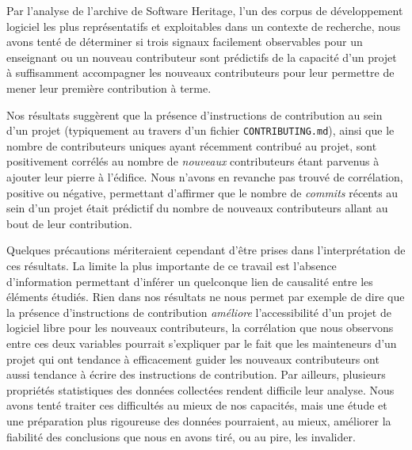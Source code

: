 \documentclass[dvipsnames,runningheads]{llncs}
\newcommand{\en}[1]{\foreignlanguage{english}{\emph{#1}}}
\begin{document}
    Par l'analyse de l'archive de Software Heritage, l'un des corpus de développement logiciel les plus
    représentatifs et exploitables dans un contexte de recherche, nous avons tenté de déterminer si trois
    signaux facilement observables pour un enseignant ou un nouveau contributeur sont prédictifs de la
    capacité d'un projet à suffisamment accompagner les nouveaux contributeurs pour leur permettre de mener
    leur première contribution à terme.

    Nos résultats suggèrent que la présence d'instructions de contribution au sein d'un projet (typiquement au
    travers d'un fichier \texttt{CONTRIBUTING.md}), ainsi que le nombre de contributeurs uniques ayant
    récemment contribué au projet, sont positivement corrélés au nombre de \emph{nouveaux} contributeurs étant
    parvenus à ajouter leur pierre à l'édifice. Nous n'avons en revanche pas trouvé de corrélation, positive
    ou négative, permettant d'affirmer que le nombre de \en{commits} récents au sein d'un projet était
    prédictif du nombre de nouveaux contributeurs allant au bout de leur contribution.

    Quelques précautions mériteraient cependant d'être prises dans l'interprétation de ces résultats. La
    limite la plus importante de ce travail est l'absence d'information permettant d'inférer un quelconque
    lien de causalité entre les éléments étudiés. Rien dans nos résultats ne nous permet par exemple de dire
    que la présence d'instructions de contribution \emph{améliore} l'accessibilité d'un projet de logiciel
    libre pour les nouveaux contributeurs, la corrélation que nous observons entre ces deux variables pourrait
    s'expliquer par le fait que les mainteneurs d'un projet qui ont tendance à efficacement guider les
    nouveaux contributeurs ont aussi tendance à écrire des instructions de contribution. Par ailleurs,
    plusieurs propriétés statistiques des données collectées rendent difficile leur analyse. Nous avons tenté
    traiter ces difficultés au mieux de nos capacités, mais une étude et une préparation plus rigoureuse des
    données pourraient, au mieux, améliorer la fiabilité des conclusions que nous en avons tiré, ou au pire,
    les invalider.
\end{document}
